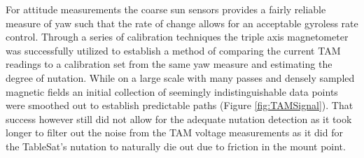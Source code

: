 For attitude measurements the coarse sun sensors provides a fairly reliable measure of yaw such that the rate of change allows for an acceptable gyroless rate control.  Through a series of calibration techniques the triple axis magnetometer was successfully utilized to establish a method of comparing the current TAM readings to a calibration set from the same yaw measure and estimating the degree of nutation.  While on a large scale with many passes and densely sampled magnetic fields an initial collection of seemingly indistinguishable data points were smoothed out to establish predictable paths (Figure \ref{fig:TAMSignal}).  That success however still did not allow for the adequate nutation detection as it took longer to filter out the noise from the TAM voltage measurements as it did for the TableSat's nutation to naturally die out due to friction in the mount point.

